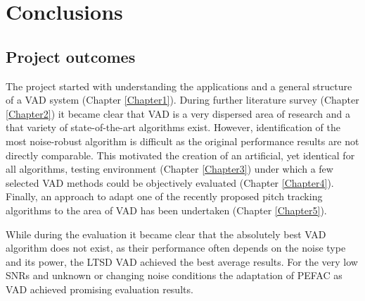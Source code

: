 
\chapter{Conclusions} %

\label{Chapter6} %



\section{Project outcomes}

The project started with understanding the applications and a general structure of a VAD system (Chapter \ref{Chapter1}). During further literature survey (Chapter \ref{Chapter2}) it became clear that VAD is a very dispersed area of research and a that variety of state-of-the-art algorithms exist. However, identification of the most noise-robust algorithm is difficult as the original performance results are not directly comparable. This motivated the creation of an artificial, yet identical for all algorithms, testing environment (Chapter \ref{Chapter3}) under which a few selected VAD methods could be objectively evaluated (Chapter \ref{Chapter4}). Finally, an approach to adapt one of the recently proposed pitch tracking algorithms to the area of VAD has been undertaken (Chapter \ref{Chapter5}).

While during the evaluation it became clear that the absolutely best VAD algorithm does not exist, as their performance often depends on the noise type and its power, the LTSD VAD achieved the best average results. For the very low SNRs and unknown or changing noise conditions the adaptation of PEFAC as VAD achieved promising evaluation results.


